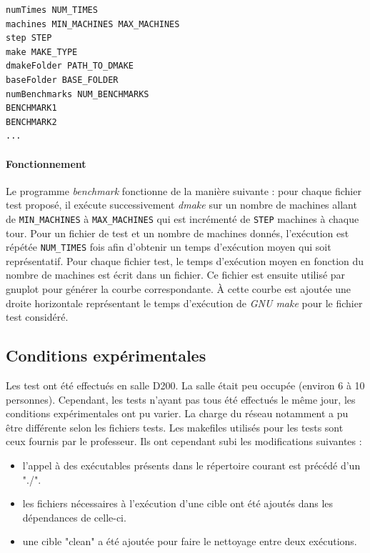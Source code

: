 \documentclass[a4paper,12pt,twoside]{article}
\begin{document}
\begin{verbatim}
numTimes NUM_TIMES
machines MIN_MACHINES MAX_MACHINES
step STEP
make MAKE_TYPE
dmakeFolder PATH_TO_DMAKE
baseFolder BASE_FOLDER
numBenchmarks NUM_BENCHMARKS
BENCHMARK1
BENCHMARK2
...
\end{verbatim}

\paragraph{Fonctionnement}

Le programme \emph{benchmark} fonctionne de la manière suivante : pour
chaque fichier test proposé, il exécute successivement \emph{dmake} sur un nombre de
machines allant de \texttt{MIN\_MACHINES} à \texttt{MAX\_MACHINES}
qui est incrémenté de \texttt{STEP} machines à chaque tour. Pour un
fichier de test et un nombre de machines donnés, l'exécution est
répétée \texttt{NUM\_TIMES} fois afin d'obtenir un temps d'exécution moyen
qui soit représentatif. 
Pour chaque fichier test, le temps d'exécution moyen en fonction du
nombre de machines est écrit dans un fichier. Ce fichier est ensuite
utilisé par gnuplot pour générer la courbe correspondante. À cette
courbe est ajoutée une droite horizontale représentant le temps
d'exécution de \emph{GNU make} pour le fichier test considéré. 

\subsection{Conditions expérimentales}

Les test ont été effectués en salle D200. La salle était peu occupée
(environ 6 à 10 personnes). Cependant, les tests n'ayant pas tous été
effectués le même jour, les conditions expérimentales ont pu
varier. La charge du réseau notamment a pu être différente selon les
fichiers tests. Les makefiles utilisés pour les tests sont ceux
fournis par le professeur. Ils ont cependant subi les modifications
suivantes : 
\begin{itemize}
\item l'appel à des exécutables présents dans le répertoire courant est
  précédé d'un "./".
\item les fichiers nécessaires à l'exécution d'une cible ont été
  ajoutés dans les dépendances de celle-ci.
\item une cible "clean" a été ajoutée pour faire le nettoyage entre deux exécutions.
\end{itemize}
\end{document}
